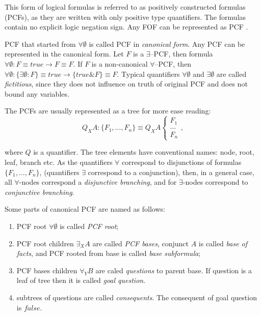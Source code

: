 \documentclass[runningheads,a4paper]{llncs}
\begin{document}
This form of logical formulas is referred to as positively constructed formulas (PCFs), as they are written with only positive type quantifiers. The formulas contain no explicit logic negation sign. Any FOF can be represented as PCF \cite{ICDS2000}.

PCF that started from $\forall \emptyset$ is called PCF in {\em canonical form}. Any PCF can be represented in the canonical form. Let $F$ is a $\exists$--PCF, then formula 
$\forall \emptyset\colon F \equiv true \rightarrow F \equiv F$. If $F$ is a non-canonical $\forall$--PCF, then $\forall \emptyset\colon\{\exists \emptyset\colon F\} \equiv true \rightarrow \{true\&F\} \equiv F$. Typical quantifiers $\forall \emptyset$ and $\exists \emptyset$ are called {\em fictitious}, since they does not influence on truth of original PCF and does not bound any variables.  %

The PCFs are usually represented as a tree for more ease reading:
$$Q_XA\colon\{F_1,\ldots,F_n\} \equiv Q_XA \left\{
\begin{array}{lcl}
 F_1 \\
 \ldots \\
 F_n
\end{array}
\right.,$$

\noindent{} where $Q$ is a quantifier. The tree elements have conventional names: node, root, leaf, branch etc. As the quantifiers $\forall$ correspond to disjunctions of formulas $\{F_1,\ldots,F_n\}$, (quantifiers $\exists$ correspond to a conjunction), then, in a general case, all $\forall$-nodes correspond a {\em disjunctive branching}, and for $\exists$-nodes correspond to {\em conjunctive branching}.

Some parts of canonical PCF are named as follows:
\begin{enumerate}
\item PCF root $\forall \emptyset$ is called {\em PCF root};
\item PCF root children $\exists_XA$ are called {\em PCF bases}, conjunct $A$ is called {\em base of facts}, and PCF rooted from base is called {\em base subformula};
\item PCF bases children $\forall_YB$ are caled {\em questions} to parent base. If question is a leaf of tree then it is called {\em goal question}. 
\item subtrees of questions are called {\em consequents}. The consequent of goal question is $false$.
\end{enumerate}
\end{document}
